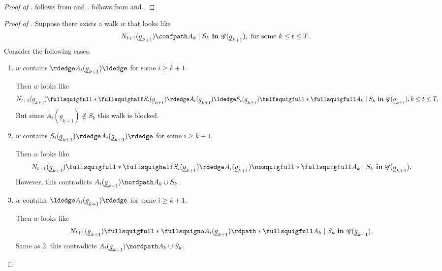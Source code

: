 \documentclass[12pt,a4paper]{article}
\theoremstyle{definition}
\newcommand{\ingraph}[1]{~\textnormal{\bf in}\,#1}
\DeclareMathOperator{\gG}{\mathscr{G}}
\begin{document}
\begin{proof}[Proof of ]
   follows from
   and
  . 
  follows from 
  and .
\end{proof}


\begin{proof}[Proof of ]
  Suppose there exists a walk $w$ that looks like
  \[
      N_{t+1}(\underline{g}_{k+1}) \confpath A_k \mid S_k
      \ingraph{\gG(\underline{g}_{k+1})},~\text{for some}~k \leq t \leq T.
  \]
  Consider the following cases.
  \begin{enumerate}
    \item $w$ contains $\rdedge A_i(\underline{g}_{k+1}) \ldedge$ for some $i \geq k+1$.

    Then $w$ looks like
    \[
        N_{t+1}(\underline{g}_{k+1}) \fullsquigfull \ast \fullsquighalf S_i(\underline{g}_{k+1}) \rdedge A_i(\underline{g}_{k+1}) \ldedge S_i(\underline{g}_{k+1}) \halfsquigfull \ast \fullsquigfull A_k \mid S_k \ingraph{\gG(\underline{g}_{k+1})}, k\leq t \leq T.
    \]
    But since $A_i(\underline{g}_{k+1}) \notin S_k$ this walk is blocked.

    \item $w$ contains $S_i(\underline{g}_{k+1}) \rdedge
      A_i(\underline{g}_{k+1}) \rdedge$ for some $i \geq k+1$.

    Then $w$ looks like
    \[
        N_{t+1}(\underline{g}_{k+1}) \fullsquigfull \ast \fullsquighalf S_i(\underline{g}_{k+1}) \rdedge A_i(\underline{g}_{k+1}) \nosquigfull \ast \fullsquigfull A_k \mid S_k \ingraph{\gG(\underline{g}_{k+1})}.
    \]
    However, this contradicts $A_i(\underline{g}_{k+1}) \nordpath A_k \cup S_k$.

    \item $w$ contains $\ldedge A_i(\underline{g}_{k+1}) \rdedge$ for
      some $i \geq k+1$.

    Then $w$ looks like
    \[
        N_{t+1}(\underline{g}_{k+1}) \fullsquigfull \ast \fullsquigno A_i(\underline{g}_{k+1}) \rdpath \ast \fullsquigfull  A_k \mid S_k \ingraph{\gG(\underline{g}_{k+1})},
    \]
    Same as 2, this contradicts $A_i(\underline{g}_{k+1}) \nordpath A_k \cup S_k$.


\end{enumerate}
\end{proof}
\end{document}
